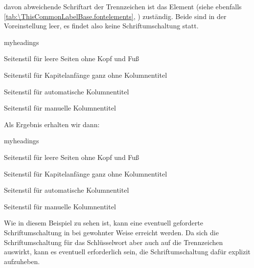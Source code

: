 davon abweichende Schriftart der Trennzeichen ist das Element
 (siehe
ebenfalls \autoref{tab:\ThisCommonLabelBase.fontelements},
) zuständig. Beide sind in
der Voreinstellung leer, es findet also keine
Schriftumschaltung statt.%
  \begin{Example}
\begin{lstcode}
  \begin{labeling}[~--]{myheadings}
    \item[empty]
      Seitenstil für leere Seiten ohne Kopf und Fuß
    \item[plain]
      Seitenstil für Kapitelanfänge ganz ohne
      Kolumnentitel
    \item[headings]
      Seitenstil für automatische Kolumnentitel
    \item[myheadings]
      Seitenstil für manuelle Kolumnentitel
  \end{labeling}
\end{lstcode}
    Als Ergebnis erhalten wir dann:
    \begin{ShowOutput}
      \begin{labeling}[~--]{myheadings}
      \item[empty]
        Seitenstil für leere Seiten ohne Kopf und Fuß
      \item[plain]
        Seitenstil für Kapitelanfänge ganz ohne
        Kolumnentitel
      \item[headings]
        Seitenstil für automatische Kolumnentitel
      \item[myheadings]
        Seitenstil für manuelle Kolumnentitel
      \end{labeling}
    \end{ShowOutput}
    Wie in diesem Beispiel zu sehen ist, kann eine eventuell geforderte
    Schriftumschaltung in bei \KOMAScript{} gewohnter Weise erreicht
    werden. Da sich die Schriftumschaltung für das Schlüsselwort aber auch auf
    die Trennzeichen auswirkt, kann es eventuell erforderlich sein, die
    Schriftumschaltung dafür explizit aufzuheben.
  \end{Example}
